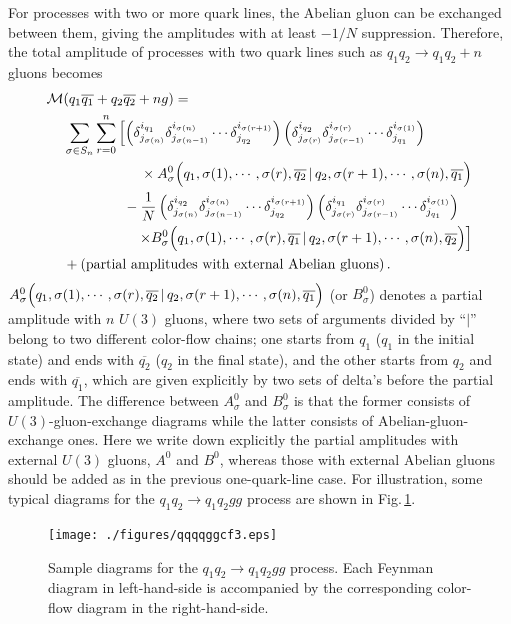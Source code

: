 \documentclass[a4paper,11pt]{article}
\begin{document}
For processes with two or more quark lines, the Abelian gluon can be
exchanged between them, giving the amplitudes with at
least $-1/N$
suppression.  Therefore, the total amplitude of processes with two quark lines such as  $q_1q_2\rightarrow q_1q_2+n$ gluons becomes
\begin{align}
{\cal M}&(q_1\overline{q_1}+q_2\overline{q_2}+ng)=\nonumber\\
&\sum_{\sigma\in S_n}\sum_{r=0}^n\left[\left(\delta^{i_{q_1}}_{j_{\sigma(n)}}
\delta^{i_{\sigma(n)}}_{j_{\sigma(n-1)}}\cdots\delta^{i_{\sigma(r+1)}}_{j_{q_2}}\right)
\left(\delta^{i_{q_2}}_{j_{\sigma(r)}}
\delta^{i_{\sigma(r)}}_{j_{\sigma(r-1)}}\cdots\delta^{i_{\sigma(1)}}_{j_{q_1}}\right)\right.\nonumber\\
&\hspace{5.5em}\times A^0_{\sigma}\Bigl(q_1,\sigma(1),\cdots,\sigma(r),\overline{q_2}\,|\,q_2,\sigma(r+1),\cdots,\sigma(n),\overline{q_1}
\Bigr)\nonumber\\
\vspace{2em}
&\hspace{4.3em}-\frac{1}{N}\left(\delta^{i_{q_2}}_{j_{\sigma(n)}}
\delta^{i_{\sigma(n)}}_{j_{\sigma(n-1)}}\cdots\delta^{i_{\sigma(r+1)}}_{j_{q_2}}\right)
\left(\delta^{i_{q_1}}_{j_{\sigma(r)}}
\delta^{i_{\sigma(r)}}_{j_{\sigma(r-1)}}\cdots\delta^{i_{\sigma(1)}}_{j_{q_1}}\right)
\nonumber\\
&\hspace{5.5em}\Bigl.\times B^0_{\sigma}\Bigl(q_1,\sigma(1),\cdots,\sigma(r),\overline{q_1}\,|\,q_2,\sigma(r+1),\cdots,\sigma(n),\overline{q_2}
\Bigr)\Bigr]\nonumber\\
&+\left({\rm partial\,\, amplitudes\,\, with \,\,external\,\,
 Abelian\,\, gluons}\right).
\label{eq:2qqng}
\end{align}
$A^0_{\sigma}\Bigl(q_1,\sigma(1),\cdots,\sigma(r),\overline{q_2}\,|\,q_2,\sigma(r+1),\cdots,\sigma(n),\overline{q_1}\Bigr)$
(or $B^0_{\sigma}$) denotes a partial
amplitude with $n$ $U(3)$ gluons, where two sets of arguments divided by ``$|$'' belong to
two different color-flow chains; one starts from $q_1$ ($q_1$ in the initial
state) and ends with $\overline{q_2}$ ($q_2$ in the final state), and the
other starts from $q_2$ and ends with $\overline{q_1}$, which are given
explicitly by two
sets of delta's before the partial amplitude. The difference between
$A^0_{\sigma}$ and $B^0_{\sigma}$ is that the former consists of $U(3)$-gluon-exchange diagrams
while the latter consists of Abelian-gluon-exchange ones.
Here we write down explicitly the partial amplitudes with external
$U(3)$ gluons,
$A^0$ and $B^0$, whereas those with external Abelian gluons should be
added as in the previous one-quark-line case. For illustration, some typical
diagrams for the $q_1q_2\rightarrow q_1q_2gg$ process
are shown in Fig.\,\ref{fig:2qqdiagrams}.
\begin{figure}
\begin{center}
\texttt{[image: ./figures/qqqqggcf3.eps]}
\caption{Sample diagrams for the $q_1q_2\rightarrow q_1q_2gg$ process. Each
 Feynman diagram in left-hand-side is accompanied by the corresponding
 color-flow diagram in the right-hand-side.}
\label{fig:2qqdiagrams}
\end{center}
\end{figure}
\end{document}
